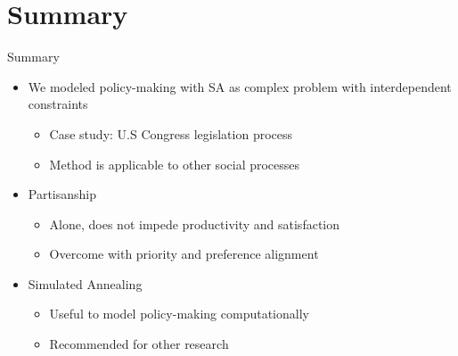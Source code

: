 \documentclass[14pt]{beamer}
\begin{document}
\section*{Summary} %
\begin{frame}{Summary}
\begin{itemize}
\item We modeled policy-making with SA as complex problem with interdependent constraints
 \begin{itemize}
 \item Case study: U.S Congress legislation process
 \item Method is applicable to other social processes
 \end{itemize}
\item Partisanship 
 \begin{itemize}
 \item Alone, does not impede productivity and satisfaction 
 \item Overcome with priority and preference alignment
 \end{itemize}
\item Simulated Annealing
 \begin{itemize} 
 \item Useful to model policy-making computationally
 \item Recommended for other research
 \end{itemize}
\end{itemize} 
\end{frame}

\end{document}
